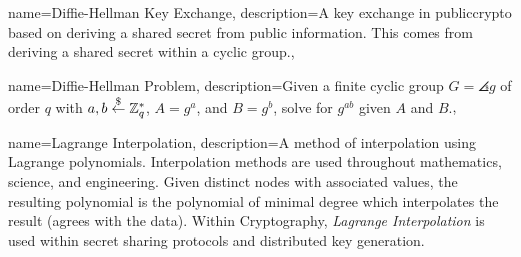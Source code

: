 {
    name={Diffie-Hellman Key Exchange},
    description={A key exchange in \gls{publiccrypto}
        based on deriving a \gls{shared secret} from public information.
        This comes from deriving a \gls{shared secret} within a
        \gls{cyclic group}.},
}

{
    name={Diffie-Hellman Problem},
    description={Given a \gls{finite cyclic group} $G = \angles{g}$
        of order $q$ with $a,b\stackrel{\$}{\leftarrow}{}\mathbb{Z}_{q}^{*}$,
        $A=g^{a}$, and $B=g^{b}$,
        solve for $g^{ab}$ given $A$ and $B$.},
}

{
    name={Lagrange Interpolation},
    description={A method of interpolation using Lagrange polynomials.
        Interpolation methods are used throughout mathematics, science,
        and engineering.
        Given distinct nodes with associated values,
        the resulting polynomial is the polynomial of minimal degree
        which interpolates the result (agrees with the data).
        Within Cryptography, \emph{Lagrange Interpolation} is used
        within secret sharing protocols and \gls{distributed key generation}.}
}
